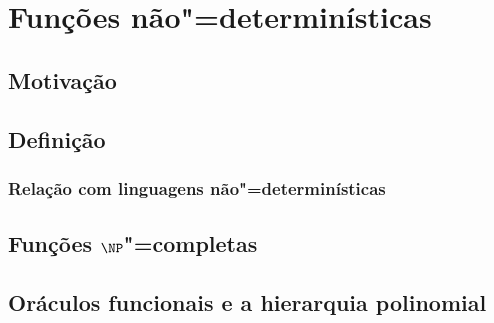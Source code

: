 \chapter{Funções não"=determinísticas}

\section{Motivação}
\section{Definição}
\subsection{Relação com linguagens não"=determinísticas}
\section{Funções $\NP$"=completas}
\section{Oráculos funcionais e a hierarquia polinomial}
